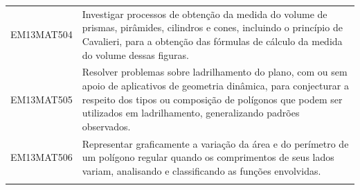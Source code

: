 \documentclass[12pt]{extarticle}
\begin{document}
\begin{longtable}{ll}
EM13MAT504 & Investigar processos de obtenção da medida do volume de prismas, pirâmides, cilindros e cones, incluindo o princípio de Cavalieri, para a obtenção das fórmulas de cálculo da medida do volume dessas figuras.                                                                                                                                                                                                                                                                                                                                                                                                                                                                                                                                                                                                        \\
\rowcolor[HTML]{FFF} 
EM13MAT505 & Resolver problemas sobre ladrilhamento do plano, com ou sem apoio de aplicativos de geometria dinâmica, para conjecturar a respeito dos tipos ou composição de polígonos que podem ser utilizados em ladrilhamento, generalizando padrões observados.                                                                                                                                                                                                                                                                                                                                                                                                                                                                                                                                                                 \\
\rowcolor[HTML]{E0F7FA} 
EM13MAT506 & Representar graficamente a variação da área e do perímetro de um polígono regular quando os comprimentos de seus lados variam, analisando e classificando as funções envolvidas.                                                                                                                                                                                                                                                                                                                                                                                                                                                                                                                                                                                                                                      \\
\rowcolor[HTML]{FFF} 

\end{longtable}
\end{document}
